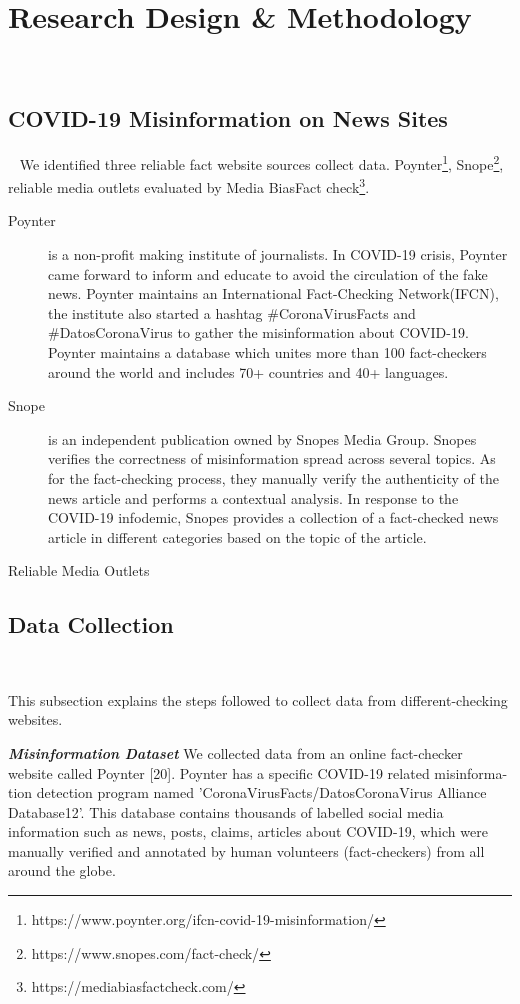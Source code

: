 \section{Research Design \& Methodology}~\label{sec:design}
\subsection{COVID-19 Misinformation on News Sites}~\label{subsec:ifcn}
We identified three reliable fact website sources collect data. Poynter\footnote{https://www.poynter.org/ifcn-covid-19-misinformation/}, Snope\footnote{https://www.snopes.com/fact-check/}, reliable media outlets evaluated by Media Bias\/Fact check\footnote{https://mediabiasfactcheck.com/}.
\begin{description}
\item[Poynter]  is a non-profit making institute of journalists. In COVID-19 crisis, Poynter came forward to inform and educate to avoid the circulation of the fake news. Poynter maintains an International Fact-Checking Network(IFCN), the institute also started a hashtag \#CoronaVirusFacts and \#DatosCoronaVirus to gather the misinformation about COVID-19. Poynter maintains a database which unites more than 100 fact-checkers around the world and includes 70+ countries and 40+ languages.
\item[Snope] is an independent publication owned by Snopes Media Group. Snopes verifies the correctness of misinformation spread across several topics. As for the fact-checking process, they manually verify the authenticity of the news article and performs a contextual analysis. In response to the COVID-19 infodemic, Snopes provides a collection of a fact-checked news article in different categories based on the topic of the article.
\item[Reliable Media Outlets] 
\end{description}

\subsection{Data Collection}~\label{subsec:DataCollect}

This subsection explains the steps followed to collect data from different-checking websites. 

\textit{\textbf{Misinformation Dataset}} We collected data from an online fact-checker website called Poynter [20]. Poynter has a specific COVID-19 related misinforma- tion detection program named ’CoronaVirusFacts/DatosCoronaVirus Alliance Database12’. This database contains thousands of labelled social media information such as news, posts, claims, articles about COVID-19, which were manually verified and annotated by human volunteers (fact-checkers) from all around the globe. 

